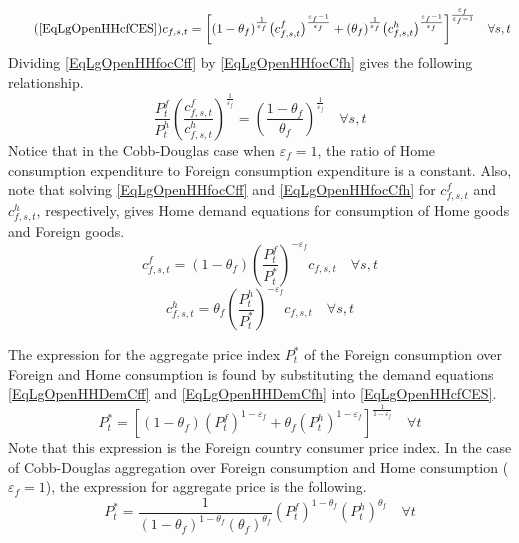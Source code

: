 \documentclass[letterpaper,12pt]{article}
\theoremstyle{definition}
\newcommand\ve{\varepsilon}
\begin{document}
    \begin{equation}\tag{\ref{EqLgOpenHHcfCES}}
      c_{f,s,t}= \biggl[(1 - \theta_f)^\frac{1}{\ve_f}\bigl(c^f_{f,s,t}\bigr)^\frac{\ve_f-1}{\ve_f} + (\theta_f)^\frac{1}{\ve_f}\bigl(c^h_{f,s,t}\bigr)^\frac{\ve_f-1}{\ve_f}\biggr]^\frac{\ve_f}{\ve_f-1} \quad\forall s,t
    \end{equation}
    Dividing \eqref{EqLgOpenHHfocCff} by \eqref{EqLgOpenHHfocCfh} gives the following relationship.
    \begin{equation}\label{EqLgOpenHHFracExpForDom}
      \frac{P^f_t}{ P^h_t} \left(\frac{c^f_{f,s,t}}{c^h_{f,s,t}}\right)^{\frac{1}{\ve_f}} = \left(\frac{1-\theta_f}{\theta_f}\right)^{\frac{1}{\ve_f}} \quad\forall s,t
    \end{equation}
    Notice that in the Cobb-Douglas case when $\ve_f=1$, the ratio of Home consumption expenditure to Foreign consumption expenditure is a constant. Also, note that solving \eqref{EqLgOpenHHfocCff} and \eqref{EqLgOpenHHfocCfh} for $c^f_{f,s,t}$ and $c^h_{f,s,t}$, respectively, gives Home demand equations for consumption of Home goods and Foreign goods.
    \begin{equation}\label{EqLgOpenHHDemCff}
          c^f_{f,s,t} = (1-\theta_f)\left(\frac{P^f_t}{P^*_t}\right)^{-\ve_f}c_{f,s,t} \quad\forall s,t
    \end{equation}
    \begin{equation}\label{EqLgOpenHHDemCfh}
          c^h_{f,s,t} = \theta_f \left(\frac{ P^h_t}{P^*_t}\right)^{-\ve_f}c_{f,s,t} \quad\forall s,t
    \end{equation}

    The expression for the aggregate price index $P^*_t$ of the Foreign consumption over Foreign and Home consumption is found by substituting the demand equations \eqref{EqLgOpenHHDemCff} and \eqref{EqLgOpenHHDemCfh} into \eqref{EqLgOpenHHcfCES}.
    \begin{equation}\label{EqLgOpenHHaggPrF}
      P^*_t = \left[(1-\theta_f)\left(P^f_t\right)^{1-\ve_f} + \theta_f\left( P^h_t\right)^{1-\ve_f}\right]^{\frac{1}{1-\ve_f}} \quad\forall t
    \end{equation}
    Note that this expression is the Foreign country consumer price index. In the case of Cobb-Douglas aggregation over Foreign consumption and Home consumption ($\ve_f=1$), the expression for aggregate price is the following.
    \begin{equation}\label{EqLgOpenHHaggPrCobbF}
      P^*_t = \frac{1}{(1-\theta_f)^{1-\theta_f}(\theta_f)^{\theta_f}} \left(P^f_t\right)^{1-\theta_f}\left(P^h_t\right)^{\theta_f} \quad\forall t
    \end{equation}
\end{document}
